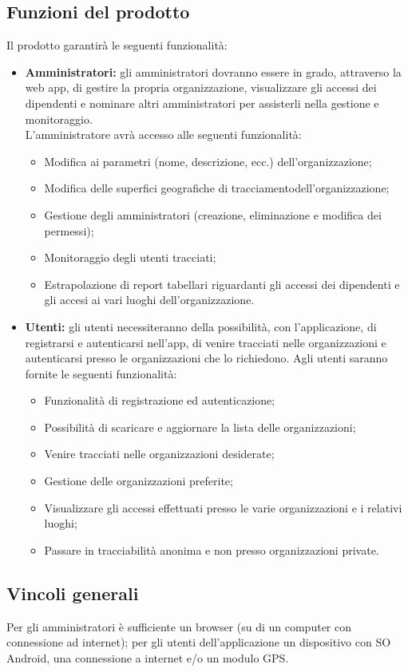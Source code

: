 \subsection{Funzioni del prodotto}
Il prodotto garantirà le seguenti funzionalità:
\begin{itemize}
    \item \textbf{Amministratori:} gli amministratori dovranno essere in grado, attraverso la web app, di gestire la propria organizzazione, visualizzare gli accessi dei dipendenti e nominare altri amministratori per assisterli nella gestione e monitoraggio. \\
        L'amministratore avrà accesso alle seguenti funzionalità:
        \begin{itemize}
            \item Modifica ai parametri (nome, descrizione, ecc.) dell'organizzazione;
            \item Modifica delle superfici geografiche di tracciamentodell'organizzazione;
            \item Gestione degli amministratori (creazione, eliminazione e modifica dei permessi);
            \item Monitoraggio degli utenti tracciati;
            \item Estrapolazione di report tabellari riguardanti gli accessi dei dipendenti e gli accesi ai vari luoghi dell'organizzazione.
        \end{itemize}
    \item \textbf{Utenti:} gli utenti necessiteranno della possibilità, con l'applicazione, di registrarsi e autenticarsi nell'app, di venire tracciati nelle organizzazioni e autenticarsi presso le organizzazioni che lo richiedono. Agli utenti saranno fornite le seguenti funzionalità:
    \begin{itemize}
        \item Funzionalità di registrazione ed autenticazione;
        \item Possibilità di scaricare e aggiornare la lista delle organizzazioni;
        \item Venire tracciati nelle organizzazioni desiderate;
        \item Gestione delle organizzazioni preferite;
        \item Visualizzare gli accessi effettuati presso le varie organizzazioni e i relativi luoghi;
        \item Passare in tracciabilità anonima e non presso organizzazioni private.
    \end{itemize}
\end{itemize}
\subsection{Vincoli generali}
Per gli amministratori è sufficiente un browser (su di un computer con connessione ad internet); per gli utenti dell'applicazione un dispositivo con SO Android, una connessione a internet e/o un modulo GPS.